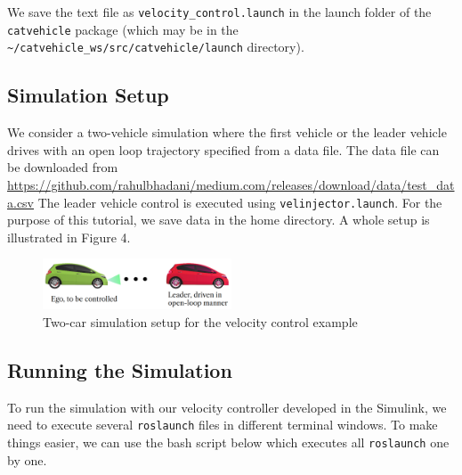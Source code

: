 \documentclass[
]{article}
\begin{document}
We save the text file as \texttt{velocity\_control.launch} in the launch
folder of the \texttt{catvehicle} package (which may be in the
\texttt{\textasciitilde{}/catvehicle\_ws/src/catvehicle/launch}
directory).

\hypertarget{simulation-setup}{%
\subsection{Simulation Setup}\label{simulation-setup}}

We consider a two-vehicle simulation where the first vehicle or the
leader vehicle drives with an open loop trajectory specified from a data
file. The data file can be downloaded from
\url{https://github.com/rahulbhadani/medium.com/releases/download/data/test_data.csv}
The leader vehicle control is executed using
\texttt{velinjector.launch}. For the purpose of this tutorial, we save
data in the home directory. A whole setup is illustrated in Figure 4.

\begin{figure}[htbp]
\centering
\includegraphics[width=0.5\textwidth]{ego_leader.png}
\caption{Two-car simulation setup for the velocity control example}
\label{fig:ego_leader.png}
\end{figure}

\hypertarget{running-the-simulation}{%
\subsection{Running the Simulation}\label{running-the-simulation}}

To run the simulation with our velocity controller developed in the
Simulink, we need to execute several \texttt{roslaunch} files in
different terminal windows. To make things easier, we can use the bash
script below which executes all \texttt{roslaunch} one by one.
\end{document}
